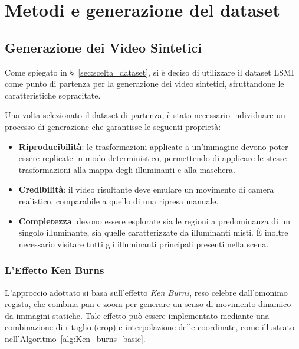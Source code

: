\chapter{Metodi e generazione del dataset}\label{chap:methods_and_materials} %

\section{Generazione dei Video Sintetici}\label{sec:generazione_dei_video_sintetici}
Come spiegato in \S~\ref{sec:scelta_dataset}, si è deciso di utilizzare il dataset LSMI \cite{kim_large_2021} come punto di partenza per la generazione dei video sintetici, sfruttandone le caratteristiche sopracitate.

Una volta selezionato il dataset di partenza, è stato necessario individuare un processo di generazione che garantisse le seguenti proprietà:

\begin{itemize}
\item \textbf{Riproducibilità}: le trasformazioni applicate a un'immagine devono poter essere replicate in modo deterministico, permettendo di applicare le stesse trasformazioni alla mappa degli illuminanti e alla maschera.
\item \textbf{Credibilità}: il video risultante deve emulare un movimento di camera realistico, comparabile a quello di una ripresa manuale.
\item \textbf{Completezza}: devono essere esplorate sia le regioni a predominanza di un singolo illuminante, sia quelle caratterizzate da illuminanti misti. È inoltre necessario visitare tutti gli illuminanti principali presenti nella scena.
\end{itemize}

\subsection{L'Effetto Ken Burns}
L'approccio adottato si basa sull'effetto \emph{Ken Burns}, reso celebre dall'omonimo regista, che combina pan e zoom per generare un senso di movimento dinamico da immagini statiche. Tale effetto può essere implementato mediante una combinazione di ritaglio (crop) e interpolazione delle coordinate, come illustrato nell'Algoritmo~\ref{alg:Ken_burns_basic}.


